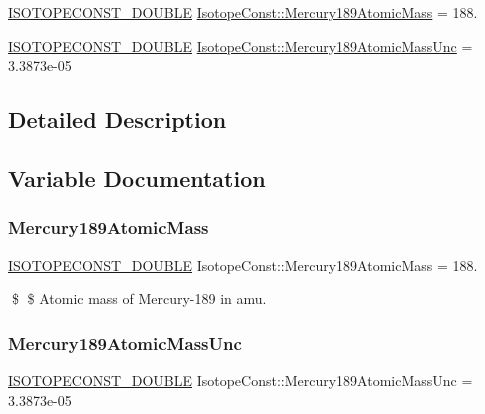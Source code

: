 \begin{DoxyCompactItemize}
\item 
\mbox{\hyperlink{group___isotope_const-_macros_ga8f45a7272ce02c0b4c65c44636ed719a}{I\+S\+O\+T\+O\+P\+E\+C\+O\+N\+S\+T\+\_\+\+D\+O\+U\+B\+LE}} \mbox{\hyperlink{group___isotope_const-_mercury-_hg189_gad3e327f130bfca43b492833c12fbb128}{Isotope\+Const\+::\+Mercury189\+Atomic\+Mass}} = 188.
\item 
\mbox{\hyperlink{group___isotope_const-_macros_ga8f45a7272ce02c0b4c65c44636ed719a}{I\+S\+O\+T\+O\+P\+E\+C\+O\+N\+S\+T\+\_\+\+D\+O\+U\+B\+LE}} \mbox{\hyperlink{group___isotope_const-_mercury-_hg189_ga4197eeb4242db911bb82acbd505982bc}{Isotope\+Const\+::\+Mercury189\+Atomic\+Mass\+Unc}} = 3.\+3873e-\/05
\end{DoxyCompactItemize}


\subsection{Detailed Description}


\subsection{Variable Documentation}
\mbox{\label{group___isotope_const-_mercury-_hg189_gad3e327f130bfca43b492833c12fbb128}} 
\subsubsection{\texorpdfstring{Mercury189\+Atomic\+Mass}{Mercury189AtomicMass}}
{\footnotesize\ttfamily \mbox{\hyperlink{group___isotope_const-_macros_ga8f45a7272ce02c0b4c65c44636ed719a}{I\+S\+O\+T\+O\+P\+E\+C\+O\+N\+S\+T\+\_\+\+D\+O\+U\+B\+LE}} Isotope\+Const\+::\+Mercury189\+Atomic\+Mass = 188.}

\$ \$ Atomic mass of Mercury-\/189 in amu. \mbox{\label{group___isotope_const-_mercury-_hg189_ga4197eeb4242db911bb82acbd505982bc}} 
\subsubsection{\texorpdfstring{Mercury189\+Atomic\+Mass\+Unc}{Mercury189AtomicMassUnc}}
{\footnotesize\ttfamily \mbox{\hyperlink{group___isotope_const-_macros_ga8f45a7272ce02c0b4c65c44636ed719a}{I\+S\+O\+T\+O\+P\+E\+C\+O\+N\+S\+T\+\_\+\+D\+O\+U\+B\+LE}} Isotope\+Const\+::\+Mercury189\+Atomic\+Mass\+Unc = 3.\+3873e-\/05}


